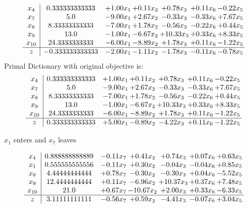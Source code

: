 \documentclass[8pt]{article}
\begin{document}
\[\begin{array}{c| c c@{\hskip 2pt} c@{\hskip 2pt} c@{\hskip 2pt} c@{\hskip 2pt} c@{\hskip 2pt} }
 x_{4}   &  0.333333333333 & +  1.00 x_{1} & +  0.11 x_{2} & +  0.78 x_{3} & +  0.11 x_{6} & -0.22 x_{5}\\
 x_{7}   &  5.0 & -9.00 x_{1} & +  2.67 x_{2} & -0.33 x_{3} & -0.33 x_{6} & +  7.67 x_{5}\\
 x_{8}   &  8.33333333333 & -7.00 x_{1} & +  1.78 x_{2} & -0.56 x_{3} & -0.22 x_{6} & +  0.44 x_{5}\\
 x_{9}   &  13.0 & -1.00 x_{1} & -6.67 x_{2} & + 10.33 x_{3} & +  0.33 x_{6} & +  8.33 x_{5}\\
 x_{10}   &  24.3333333333 & -6.00 x_{1} & -8.89 x_{2} & +  1.78 x_{3} & +  0.11 x_{6} & -1.22 x_{5}\\
\hline
z    &  -0.333333333333 & -2.00 x_{1} & -1.11 x_{2} & -1.78 x_{3} & -0.11 x_{6} & -0.78 x_{5}\\
\end{array}\]
Primal Dictionary with original objective is:
\[\begin{array}{c| c c@{\hskip 2pt} c@{\hskip 2pt} c@{\hskip 2pt} c@{\hskip 2pt} c@{\hskip 2pt} }
 x_{4}   &  0.333333333333 & +  1.00 x_{1} & +  0.11 x_{2} & +  0.78 x_{3} & +  0.11 x_{6} & -0.22 x_{5}\\
 x_{7}   &  5.0 & -9.00 x_{1} & +  2.67 x_{2} & -0.33 x_{3} & -0.33 x_{6} & +  7.67 x_{5}\\
 x_{8}   &  8.33333333333 & -7.00 x_{1} & +  1.78 x_{2} & -0.56 x_{3} & -0.22 x_{6} & +  0.44 x_{5}\\
 x_{9}   &  13.0 & -1.00 x_{1} & -6.67 x_{2} & + 10.33 x_{3} & +  0.33 x_{6} & +  8.33 x_{5}\\
 x_{10}   &  24.3333333333 & -6.00 x_{1} & -8.89 x_{2} & +  1.78 x_{3} & +  0.11 x_{6} & -1.22 x_{5}\\
\hline
z    &  0.333333333333 & +  5.00 x_{1} & -0.89 x_{2} & -4.22 x_{3} & +  0.11 x_{6} & -1.22 x_{5}\\
\end{array}\]


 $ x_{1} $ enters and $ x_{7} $ leaves 

 \[\begin{array}{c| c c@{\hskip 2pt} c@{\hskip 2pt} c@{\hskip 2pt} c@{\hskip 2pt} c@{\hskip 2pt} }
 x_{4}   &  0.888888888889 & -0.11 x_{7} & +  0.41 x_{2} & +  0.74 x_{3} & +  0.07 x_{6} & +  0.63 x_{5}\\
 x_{1}   &  0.555555555556 & -0.11 x_{7} & +  0.30 x_{2} & -0.04 x_{3} & -0.04 x_{6} & +  0.85 x_{5}\\
 x_{8}   &  4.44444444444 & +  0.78 x_{7} & -0.30 x_{2} & -0.30 x_{3} & +  0.04 x_{6} & -5.52 x_{5}\\
 x_{9}   &  12.4444444444 & +  0.11 x_{7} & -6.96 x_{2} & + 10.37 x_{3} & +  0.37 x_{6} & +  7.48 x_{5}\\
 x_{10}   &  21.0 & +  0.67 x_{7} & -10.67 x_{2} & +  2.00 x_{3} & +  0.33 x_{6} & -6.33 x_{5}\\
\hline
z    &  3.11111111111 & -0.56 x_{7} & +  0.59 x_{2} & -4.41 x_{3} & -0.07 x_{6} & +  3.04 x_{5}\\
\end{array}\]
\end{document}
